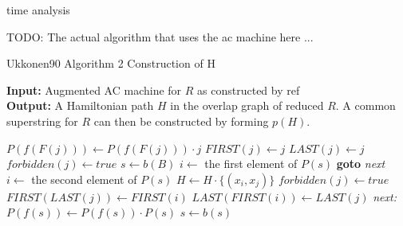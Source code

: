 \documentclass[english,twoside,censored,csm,algorithms-track-2020]{HYthesisML}
\theoremstyle{plain}
\theoremstyle{definition}
\begin{document}
time analysis



TODO: The actual algorithm that uses the ac machine here ...

  
  

  \begin{algorithm}[h]
    \caption{Ukkonen90 Algorithm 2 Construction of H} \label{ukk-h}
    \hspace*{\algorithmicindent} \textbf{Input:} Augmented AC machine for $R$ as constructed by ref\\ %
    \hspace*{\algorithmicindent} \textbf{Output:} A Hamiltonian path $H$ in the overlap graph of reduced $R$. A common superstring for $R$ can then be constructed by forming $p(H)$.\\

    \begin{algorithmic}[1]
            \State $P(f(F(j)))\gets P(f(F(j)))\cdot {j}$
            \State $FIRST(j)\gets j$
            \State $LAST(j)\gets j$
          \Else
            \State $forbidden(j)\gets true$
          \EndIf
        \EndFor  
        \State $s\gets b(B)$
              \State $i\gets$ the first element of $P(s)$
                  \hspace*{\algorithmicindent} \textbf{goto} \textit{next}
                \Else
                  \State $i\gets$ the second element of $P(s)$
                \EndIf
              \EndIf  
            \State $H\gets H\cdot \{(x_i,x_j)\}$
            \State $forbidden(j)\gets true$
            \State $FIRST(LAST(j))\gets FIRST(i)$
            \State $LAST(FIRST(i))\gets LAST(j)$
            \hspace*{\algorithmicindent} \textit{next:}
            \EndFor
          \State $P(f(s))\gets P(f(s))\cdot P(s)$
          \EndIf
          \State $s\gets b(s)$
        \EndWhile
      \EndFunction
    \end{algorithmic}
  \end{algorithm}
  
\end{document}
